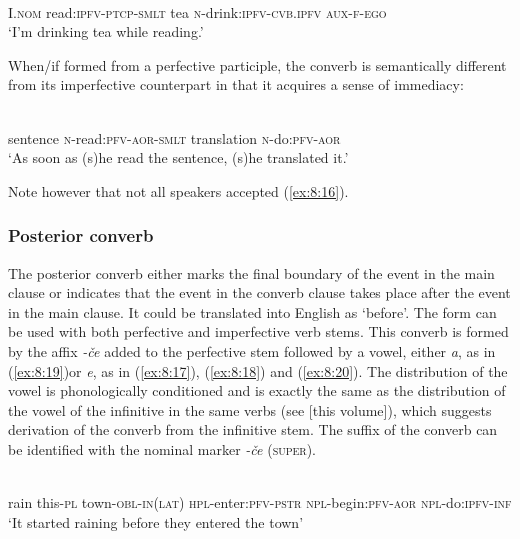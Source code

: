 ﻿\documentclass[output=paper]{langsci/langscibook}
\begin{document}
\ex \label{ex:8:15} %
\\
I.\textsc{nom} read:\textsc{ipfv}-\textsc{ptcp}-\textsc{smlt} tea \textsc{n}-drink:\textsc{ipfv}-\textsc{cvb.ipfv} \textsc{aux}-\textsc{f}-\textsc{ego}\\
\glt `I'm drinking tea while reading.'
\z

When/if formed from a perfective participle, the converb is semantically
different from its imperfective counterpart in that it acquires a sense of
immediacy:

\ea \label{ex:8:16} %
\\
sentence \textsc{n}-read:\textsc{pfv}-\textsc{aor}-\textsc{smlt} translation \textsc{n}-do:\textsc{pfv}-\textsc{aor}\\
\glt `As soon as (s)he read the sentence, (s)he translated it.'
\z

Note however that not all speakers accepted (\ref{ex:8:16}).



\subsubsection{Posterior converb}

The posterior converb either marks the final boundary of the event in
the main clause or indicates that the event in the converb clause
takes place after the event in the main clause. It could be translated into
English as `before'. The form can be used with both perfective and
imperfective verb stems. This converb is formed by the affix \emph{-če}
added to the perfective stem followed by a vowel,
either \emph{a}, as in (\ref{ex:8:19})\pagebreak[3] or \emph{e}, as in (\ref{ex:8:17}), (\ref{ex:8:18}) and (\ref{ex:8:20}).
The distribution of the
vowel is phonologically conditioned and is exactly the same as the distribution of the
vowel of the infinitive in the same verbs (see \citealt{daniel2019} [this volume]),
which suggests derivation of the converb from the infinitive stem.
The suffix of the converb can be identified with the nominal marker \emph{-če}
(\textsc{super}).

\ea \label{ex:8:17} %
\\
rain this-\textsc{pl} town-\textsc{obl}-\textsc{in(lat)} \textsc{hpl}-enter:\textsc{pfv}-\textsc{pstr} \textsc{npl}-begin:\textsc{pfv}-\textsc{aor} \textsc{npl}-do:\textsc{ipfv}-\textsc{inf}\\
\glt `It started raining before they entered the town'
\end{document}
